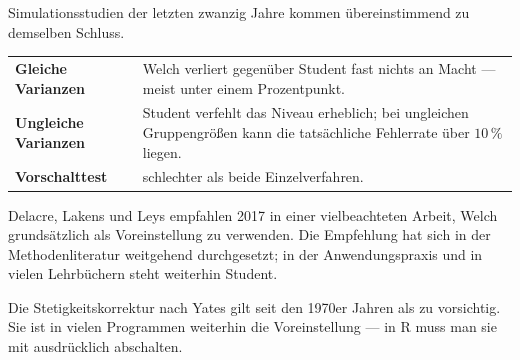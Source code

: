 \begin{forschung}
Simulationsstudien der letzten zwanzig Jahre kommen übereinstimmend zu demselben Schluss.

\begin{center}
{\small
\renewcommand{\arraystretch}{1.45}
\begin{tabular}{@{}P{2.6cm}P{5.6cm}@{}}
\toprule
\textbf{Gleiche Varianzen} & Welch verliert gegenüber Student fast nichts an Macht --- meist unter einem Prozentpunkt.\\
\textbf{Ungleiche Varianzen} & Student verfehlt das Niveau erheblich; bei ungleichen Gruppengrößen kann die tatsächliche Fehlerrate über $10\,\%$ liegen.\\
\textbf{Vorschalttest} & schlechter als beide Einzelverfahren.\\
\bottomrule
\end{tabular}}
\end{center}

Delacre, Lakens und Leys empfahlen 2017 in einer vielbeachteten Arbeit, Welch grundsätzlich als Voreinstellung zu verwenden. Die Empfehlung hat sich in der Methodenliteratur weitgehend durchgesetzt; in der Anwendungspraxis und in vielen Lehrbüchern steht weiterhin Student.

\begin{center}
\begin{minipage}{0.88\textwidth}
\end{minipage}
\end{center}

Die Stetigkeitskorrektur nach Yates gilt seit den 1970er Jahren als zu vorsichtig. Sie ist in vielen Programmen weiterhin die Voreinstellung --- in R muss man sie mit  ausdrücklich abschalten.
\end{forschung}


